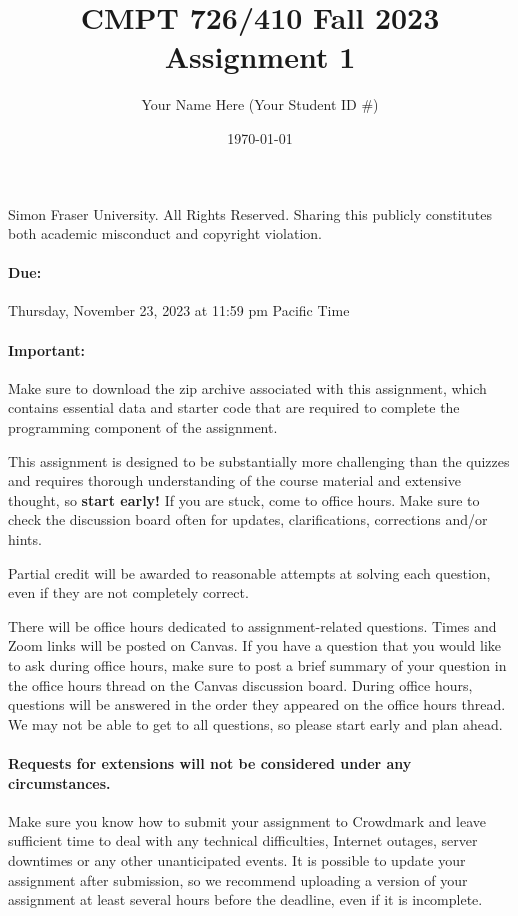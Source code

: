 \documentclass[10pt]{article}
\title{CMPT 726/410 Fall 2023 Assignment 1} %
\author{Your Name Here (Your Student ID \#)} %
\date{\today}
\begin{document}
\maketitle

\textcopyright Simon Fraser University. All Rights Reserved. Sharing this publicly constitutes both academic misconduct and copyright violation.


\paragraph{Due:} Thursday, November 23, 2023 at 11:59 pm Pacific Time

\paragraph{Important:} Make sure to download the zip archive associated with this assignment, which contains essential data and starter code that are required to complete the programming component of the assignment.

This assignment is designed to be substantially more challenging than the quizzes and requires thorough understanding of the course material and extensive thought, so \textbf{start early!} If you are stuck, come to office hours. Make sure to check the discussion board often for updates, clarifications, corrections and/or hints. 

Partial credit will be awarded to reasonable attempts at solving each question, even if they are not completely correct. 

There will be office hours dedicated to assignment-related questions. Times and Zoom links will be posted on Canvas. If you have a question that you would like to ask during office hours, make sure to post a brief summary of your question in the office hours thread on the Canvas discussion board. During office hours, questions will be answered in the order they appeared on the office hours thread. We may not be able to get to all questions, so please start early and plan ahead.

\paragraph{Requests for extensions will not be considered under any circumstances.}{Make sure you know how to submit your assignment to Crowdmark and leave sufficient time to deal with any technical difficulties, Internet outages, server downtimes or any other unanticipated events. It is possible to update your assignment after submission, so we recommend uploading a version of your assignment at least several hours before the deadline, even if it is incomplete.}
\end{document}
